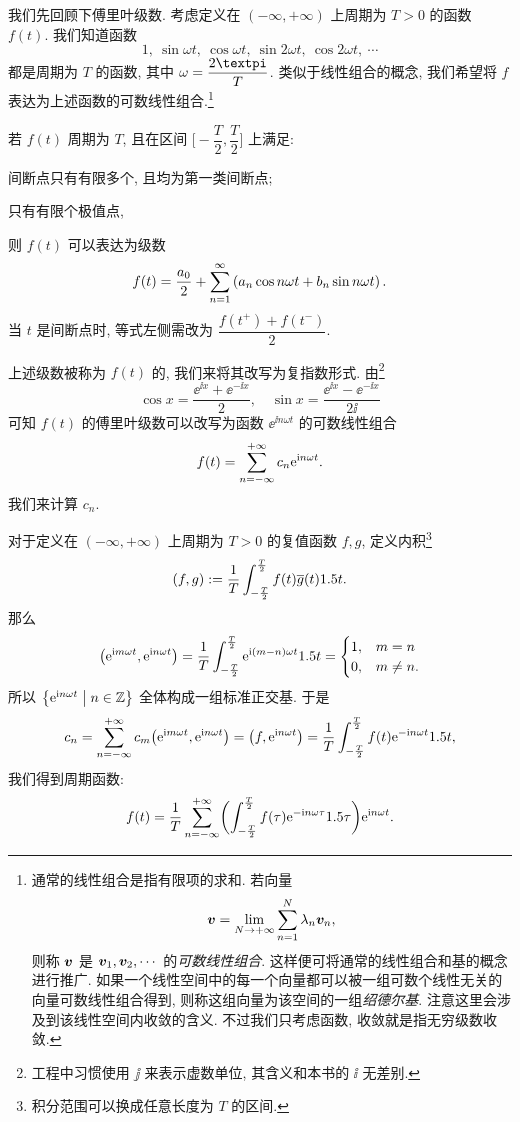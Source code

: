 我们先回顾下傅里叶级数.
考虑定义在 $(-\infty,+\infty)$ 上周期为 $T>0$ 的函数 $f(t)$.
我们知道函数
\[
  1,\ \sin{\omega t},\ \cos{\omega t},\ 
  \sin{2\omega t},\ \cos{2\omega t},\ \cdots
\]
都是周期为 $T$ 的函数, 其中 $\omega=\dfrac{2\cpi}T$.
类似于线性组合的概念, 我们希望将 $f$ 表达为上述函数的可数线性组合.\footnote{
  通常的线性组合是指有限项的求和.
  若向量
  \[
    {\boldsymbol{v}}=\lim\limits_{N\rightarrow+\infty} \sum_{n=1}^N\lambda_n {\boldsymbol{v}}_n,
  \]
  则称 ${\boldsymbol{v}}$ 是 ${\boldsymbol{v}}_1,{\boldsymbol{v}}_2,\cdots$ 的\emph{可数线性组合}.
  这样便可将通常的线性组合和基的概念进行推广.
  如果一个线性空间中的每一个向量都可以被一组可数个线性无关的向量可数线性组合得到, 则称这组向量为该空间的一组\emph{绍德尔基}.
  注意这里会涉及到该线性空间内收敛的含义.
  不过我们只考虑函数, 收敛就是指无穷级数收敛.
}

\begin{theorem}
  若 $f(t)$ 周期为 $T$, 且在区间 $\bigl[-\dfrac T2,\dfrac T2\bigr]$ 上满足:\smallskip
  \begin{enuma}[labelindent=.5em]
    \item 间断点只有有限多个, 且均为第一类间断点;
    \item 只有有限个极值点,
  \end{enuma}
  则 $f(t)$ 可以表达为级数
  \[
    f(t)=\frac{a_0}2+\displaystyle\sum_{n=1}^{\infty} \left(a_n\cos n\omega t+b_n \sin n\omega t\right).
  \]
  当 $t$ 是间断点时, 等式左侧需改为 $\dfrac{f(t^+)+f(t^-)}2$.
\end{theorem}
上述级数被称为 $f(t)$ 的, 我们来将其改写为复指数形式.
由\footnote{工程中习惯使用 $\jj$ 来表示虚数单位, 其含义和本书的 $\ii$ 无差别.}
\[
  \cos x=\frac{\ee^{\ii x}+\ee^{-\ii x}}2,\quad \sin x=\frac{\ee^{\ii x}-\ee^{-\ii x}}{2\ii }
\]
可知 $f(t)$ 的傅里叶级数可以改写为函数 $\ee^{\ii n\omega t}$ 的可数线性组合
\[
  f(t)=\displaystyle\sum_{n=-\infty}^{+\infty} c_n\mathrm{e}^{\mathrm{i} n\omega t}.
\]
我们来计算 $c_n$.

对于定义在 $(-\infty,+\infty)$ 上周期为 $T>0$ 的\alert{复值}函数 $f,g$, 定义内积\footnote{
  积分范围可以换成任意长度为 $T$ 的区间.
}
\[
  (f,g):=\frac1T\displaystyle\int_{-\frac T2}^{\frac T2} f(t)\overline g(t)1.5 t.
\]
那么
\[
  \bigl(\mathrm{e}^{\mathrm{i} m\omega t},\mathrm{e}^{\mathrm{i} n\omega t}\bigr)
  =\frac1T\displaystyle\int_{-\frac T2}^{\frac T2} \mathrm{e}^{\mathrm{i} (m-n)\omega t}1.5 t
  =\begin{cases}
    1,&m=n\\
    0,&m\neq n.
  \end{cases}
\]
所以 $\bigl\{\mathrm{e}^{\mathrm{i} n\omega t}\bigm\vert n\in{\mathbb{Z}}\bigr\}$ 全体构成一组标准正交基. 于是
\[
  c_n=\displaystyle\sum_{n=-\infty}^{+\infty} c_m\bigl(\mathrm{e}^{\mathrm{i} m\omega t},\mathrm{e}^{\mathrm{i} n\omega t}\bigr)
  =\bigl(f,\mathrm{e}^{\mathrm{i} n\omega t}\bigr)
  =\frac 1T\displaystyle\int_{-\frac T2}^{\frac T2} f(t)\mathrm{e}^{-\mathrm{i} n\omega t} 1.5 t,
\]
我们得到周期函数:
\[
  f(t)=\frac 1T\displaystyle\sum_{n=-\infty}^{+\infty} \biggl(\displaystyle\int_{-\frac T2}^{\frac T2} f(\tau)\mathrm{e}^{-\mathrm{i} n\omega\tau} 1.5\tau\biggr) \mathrm{e}^{\mathrm{i} n\omega t}.
\]

